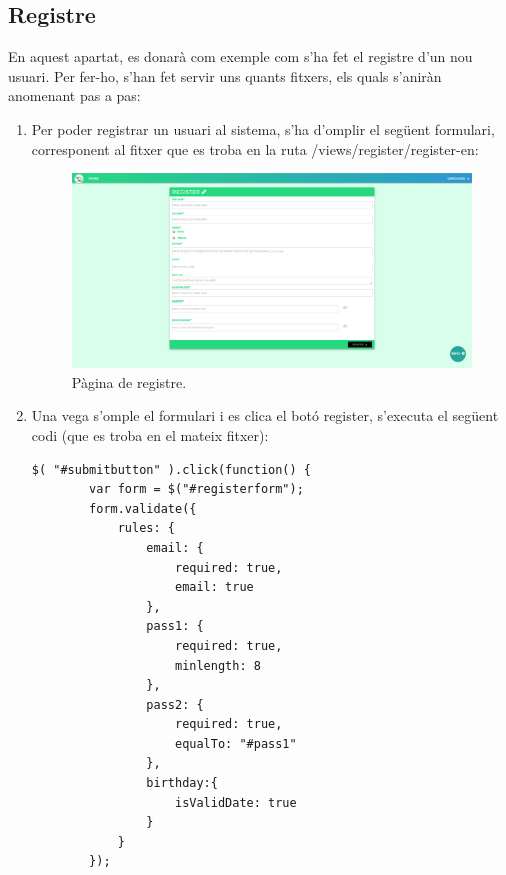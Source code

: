 \documentclass[11pt,catalan,listoffigures,listoftables]{tfgetsinf}
\begin{document}
\subsection{Registre}
En aquest apartat, es donarà com exemple com s'ha fet el registre d'un nou usuari. Per fer-ho, s'han fet servir uns quants fitxers, els quals s'aniràn anomenant pas a pas:
\newpage
\begin{enumerate}
	\item Per poder registrar un usuari al sistema, s'ha d'omplir el següent formulari, corresponent al fitxer que es troba en la ruta /views/register/register-en:
\begin{figure}[h]
\includegraphics[width=15cm]{images/image13}
\centering
\caption[Figura 4.8]{Pàgina de registre.}
\centering
\end{figure}
\item Una vega s'omple el formulari i es clica el botó register, s'executa el següent codi (que es troba en el mateix fitxer):
\begin{lstlisting}
$( "#submitbutton" ).click(function() {
        var form = $("#registerform");
        form.validate({
            rules: {
                email: {
                    required: true,
                    email: true
                },
                pass1: {
                    required: true,
                    minlength: 8
                },
                pass2: {
                    required: true,
                    equalTo: "#pass1"
                },
                birthday:{
                    isValidDate: true
                }
            }
        });


\end{lstlisting}
\end{enumerate}
\end{document}
